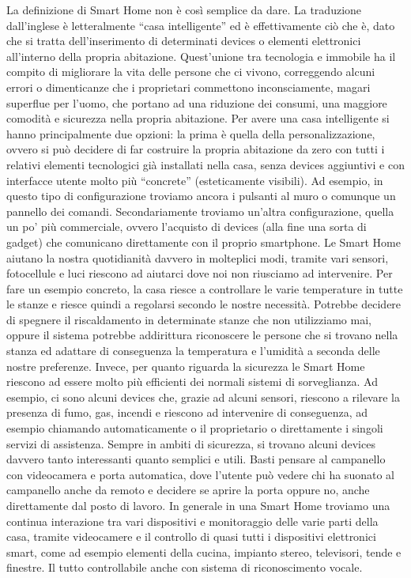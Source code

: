 La definizione di Smart Home non è così semplice da dare. La traduzione dall’inglese è letteralmente “casa intelligente” ed è effettivamente ciò che è, dato che si tratta dell’inserimento di determinati devices o elementi elettronici all’interno della propria abitazione. Quest’unione tra tecnologia e immobile ha il compito di migliorare la vita delle persone che ci vivono, correggendo alcuni errori o dimenticanze che i proprietari commettono inconsciamente, magari superflue per l’uomo, che portano ad una riduzione dei consumi, una maggiore comodità e sicurezza nella propria abitazione.
Per avere una casa intelligente si hanno principalmente due opzioni: la prima è quella della personalizzazione, ovvero si può decidere di far costruire la propria abitazione da zero con tutti i relativi elementi tecnologici già installati nella casa, senza devices aggiuntivi e con interfacce utente molto più “concrete” (esteticamente visibili). Ad esempio, in questo tipo di configurazione troviamo ancora i pulsanti al muro o comunque un pannello dei comandi. Secondariamente troviamo un’altra configurazione, quella un po’ più commerciale, ovvero l’acquisto di devices (alla fine una sorta di gadget) che comunicano direttamente con il proprio smartphone.
Le Smart Home aiutano la nostra quotidianità davvero in molteplici modi, tramite vari sensori, fotocellule e luci riescono ad aiutarci dove noi non riusciamo ad intervenire.
Per fare un esempio concreto, la casa riesce a controllare le varie temperature in tutte le stanze e riesce quindi a regolarsi secondo le nostre necessità. Potrebbe decidere di spegnere il riscaldamento in determinate stanze che non utilizziamo mai, oppure il sistema potrebbe addirittura riconoscere le persone che si trovano nella stanza ed adattare di conseguenza la temperatura e l’umidità a seconda delle nostre preferenze.
Invece, per quanto riguarda la sicurezza le Smart Home riescono ad essere molto più efficienti dei normali sistemi di sorveglianza.
Ad esempio, ci sono alcuni devices che, grazie ad alcuni sensori, riescono a rilevare la presenza di fumo, gas, incendi e riescono ad intervenire di conseguenza, ad esempio chiamando automaticamente o il proprietario o direttamente i singoli servizi di assistenza.
Sempre in ambiti di sicurezza, si trovano alcuni devices davvero tanto interessanti quanto semplici e utili. Basti pensare al campanello con videocamera e porta automatica, dove l’utente può vedere chi ha suonato al campanello anche da remoto e decidere se aprire la porta oppure no, anche direttamente dal posto di lavoro.
In generale in una Smart Home troviamo una continua interazione tra vari dispositivi e monitoraggio delle varie parti della casa, tramite videocamere e il controllo di quasi tutti i dispositivi elettronici smart, come ad esempio elementi della cucina, impianto stereo, televisori, tende e finestre. Il tutto controllabile anche con sistema di riconoscimento vocale.
